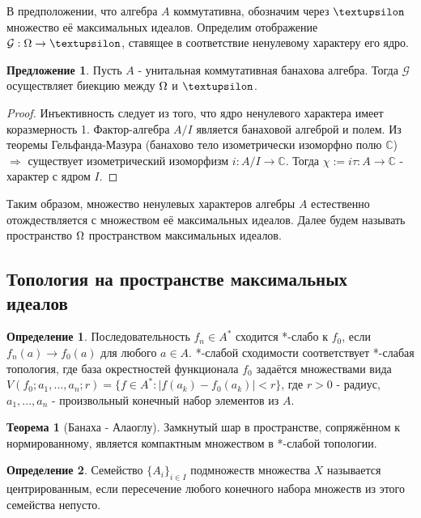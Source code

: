 \documentclass[12pt]{extarticle}
\theoremstyle{definition}
\newtheorem{theorem}{\indent Теорема}[section]
\newtheorem{definition}{\indent Определение}[section]
\newtheorem{suggestion}{\indent Предложение}[section]
\begin{document}
    В предположении, что алгебра $A$ коммутативна, обозначим через $\textupsilon$ множество её максимальных идеалов. Определим отображение $\mathcal{G}: \ohm \rightarrow \textupsilon$, ставящее в соответствие ненулевому характеру его ядро.
    
    \begin{suggestion}
    Пусть $A$ - унитальная коммутативная банахова алгебра. Тогда $\mathcal{G}$ осуществляет биекцию между $\ohm$ и $\textupsilon$.
    \end{suggestion} 
     \begin{proof}
     Инъективность следует из того, что ядро ненулевого характера имеет коразмерность 1. Фактор-алгебра $A/I$ является банаховой алгеброй и полем. Из теоремы Гельфанда-Мазура (банахово тело изометрически изоморфно полю $\mathds{C}$) $\Rightarrow$ существует изометрический изоморфизм $i: A/I \rightarrow \mathds{C}$. Тогда $\chi := i\tau : A \rightarrow \mathds{C}$ - характер с ядром $I$.
      \end{proof}
      
      Таким образом, множество ненулевых характеров алгебры $A$ естественно отождествляется с множеством её максимальных идеалов. Далее будем называть пространство $\ohm$ пространством максимальных идеалов.
      
      \subsection{Топология на пространстве максимальных идеалов}
      
      \begin{definition}
        Последовательность $f_n \in A^*$ сходится *-слабо к $f_0$, если $f_n(a) \rightarrow f_0(a)$ для любого $a \in A$. *-слабой сходимости соответствует *-слабая топология, где база окрестностей функционала $f_0$ задаётся множествами вида $V(f_0; a_1, ..., a_n; r) = \{f \in A^*: |f(a_k) - f_0(a_k)| < r\}$, где $r>0$ - радиус, $a_1, ..., a_n$ - произвольный конечный набор элементов из $A$.
    \end{definition}
    
    \begin{theorem}[Банаха - Алаоглу]
    Замкнутый шар в пространстве, сопряжённом к нормированному, является компактным множеством в *-слабой топологии.
    \end{theorem}
    
    \begin{definition}
    Семейство $\{A_i\}_{i \in I}$ подмножеств множества $X$ называется центрированным, если пересечение любого конечного набора множеств из этого семейства непусто.
    \end{definition}
    
\end{document}
